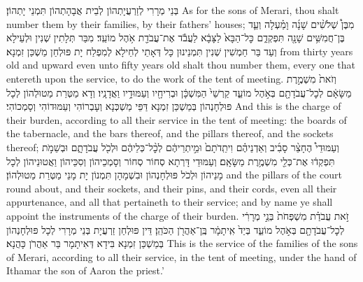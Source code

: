 {בְּנֵי מְרָרִי לְזַרְעֲיָתְהוֹן לְבֵית אֲבָהָתְהוֹן תִּמְנֵי יָתְהוֹן׃}
{As for the sons of Merari, thou shalt number them by their families, by their fathers’ houses;}{}
{מִבֶּן֩ שְׁלֹשִׁ֨ים שָׁנָ֜ה וָמַ֗עְלָה וְעַ֛ד בֶּן־חֲמִשִּׁ֥ים שָׁנָ֖ה תִּפְקְדֵ֑ם כׇּל־הַבָּא֙ לַצָּבָ֔א לַעֲבֹ֕ד אֶת־עֲבֹדַ֖ת אֹ֥הֶל מוֹעֵֽד׃}
{מִבַּר תְּלָתִין שְׁנִין וּלְעֵילָא וְעַד בַּר חַמְשִׁין שְׁנִין תִּמְנֵינוּן כָּל דְּאָתֵי לְחֵילָא לְמִפְלַח יָת פּוּלְחַן מַשְׁכַּן זִמְנָא׃}
{from thirty years old and upward even unto fifty years old shalt thou number them, every one that entereth upon the service, to do the work of the tent of meeting.}{}
{וְזֹאת֙ מִשְׁמֶ֣רֶת מַשָּׂאָ֔ם לְכׇל־עֲבֹדָתָ֖ם בְּאֹ֣הֶל מוֹעֵ֑ד קַרְשֵׁי֙ הַמִּשְׁכָּ֔ן וּבְרִיחָ֖יו וְעַמּוּדָ֥יו וַאֲדָנָֽיו׃}
{וְדָא מַטְּרַת מַטוּלְהוֹן לְכָל פּוּלְחָנְהוֹן בְּמַשְׁכַּן זִמְנָא דַּפֵּי מַשְׁכְּנָא וְעָבְרוֹהִי וְעַמּוּדוֹהִי וְסָמְכוֹהִי׃}
{And this is the charge of their burden, according to all their service in the tent of meeting: the boards of the tabernacle, and the bars thereof, and the pillars thereof, and the sockets thereof;}{}
{וְעַמּוּדֵי֩ הֶחָצֵ֨ר סָבִ֜יב וְאַדְנֵיהֶ֗ם וִיתֵֽדֹתָם֙ וּמֵ֣יתְרֵיהֶ֔ם לְכׇ֨ל־כְּלֵיהֶ֔ם וּלְכֹ֖ל עֲבֹדָתָ֑ם וּבְשֵׁמֹ֣ת תִּפְקְד֔וּ אֶת־כְּלֵ֖י מִשְׁמֶ֥רֶת מַשָּׂאָֽם׃
}
{וְעַמּוּדֵי דָּרְתָא סְחוֹר סְחוֹר וְסָמְכֵיהוֹן וְסִכֵּיהוֹן וַאֲטוּנֵיהוֹן לְכָל מָנֵיהוֹן וּלְכֹל פּוּלְחָנְהוֹן וּבִשְׁמָהָן תִּמְנוֹן יָת מָנֵי מַטְּרַת מַטוּלְהוֹן׃}
{and the pillars of the court round about, and their sockets, and their pins, and their cords, even all their appurtenance, and all that pertaineth to their service; and by name ye shall appoint the instruments of the charge of their burden.}{}
{זֹ֣את עֲבֹדַ֗ת מִשְׁפְּחֹת֙ בְּנֵ֣י מְרָרִ֔י לְכׇל־עֲבֹדָתָ֖ם בְּאֹ֣הֶל מוֹעֵ֑ד בְּיַד֙ אִֽיתָמָ֔ר בֶּֽן־אַהֲרֹ֖ן הַכֹּהֵֽן׃}
{דֵּין פּוּלְחַן זַרְעֲיָת בְּנֵי מְרָרִי לְכָל פּוּלְחָנְהוֹן בְּמַשְׁכַּן זִמְנָא בִּידָא דְּאִיתָמָר בַּר אַהֲרֹן כָּהֲנָא׃}
{This is the service of the families of the sons of Merari, according to all their service, in the tent of meeting, under the hand of Ithamar the son of Aaron the priest.’}{}
